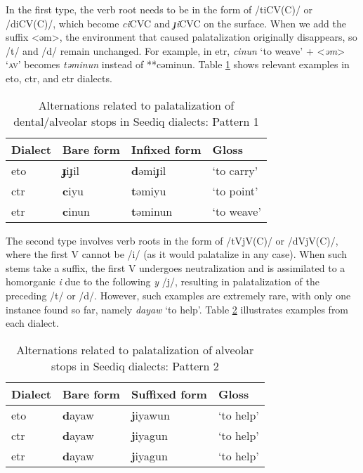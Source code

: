 In the first type, the verb root needs to be in the form of /tiCV(C)/ or /diCV(C)/, which become \textit{ci}CVC and \textit{ɟi}CVC on the surface. When we add the suffix <əm>, the environment that caused palatalization originally disappears, so /t/ and /d/ remain unchanged. For example, in \acl{etr}, \textit{cinun} `to weave' + <\textit{əm}> `\textsc{av}' becomes \textit{təminun} instead of **cəminun. Table \ref{tab:cjtd_alt_1} shows relevant examples in \acl{eto}, \acl{ctr}, and \acl{etr} dialects. 

\begin{table}[!htbp]
\centering
\caption{Alternations related to palatalization of dental/alveolar stops in Seediq dialects: Pattern 1}
\label{tab:cjtd_alt_1}
\begin{tabular}{llll}
\hline
Dialect   & Bare form & Infixed form & Gloss      \\ \hline
\acl{eto} & \textbf{ɟ}iɟil     & \textbf{d}əmiɟil      & `to carry' \\
\acl{ctr} & \textbf{c}iyu      & \textbf{t}əmiyu       & `to point' \\
\acl{etr} & \textbf{c}inun     & \textbf{t}əminun      & `to weave' \\ \hline
\end{tabular}
\end{table}

The second type involves verb roots in the form of /tVjV(C)/ or /dVjV(C)/, where the first V cannot be /i/ (as it would palatalize in any case). When such stems take a suffix, the first V undergoes neutralization and is assimilated to a homorganic \textit{i} due to the following \textit{y} /j/, resulting in palatalization of the preceding /t/ or /d/. However, such examples are extremely rare, with only one instance found so far, namely \textit{dayaw} `to help'. Table \ref{tab:cjtd_alt_2} illustrates examples from each dialect.

\begin{table}[!htbp]
\centering
\caption{Alternations related to palatalization of alveolar stops in Seediq dialects: Pattern 2}
\label{tab:cjtd_alt_2}
\begin{tabular}{llll}
\hline
Dialect   & Bare form & Suffixed form & Gloss     \\ \hline
\acl{eto} & \textbf{d}ayaw     & \textbf{j}iyawun      & `to help' \\
\acl{ctr} & \textbf{d}ayaw     & \textbf{j}iyagun      & `to help' \\
\acl{etr} & \textbf{d}ayaw     & \textbf{j}iyagun      & `to help' \\ \hline
\end{tabular}
\end{table}

